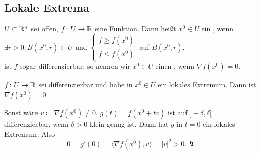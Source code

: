 \subsection{Lokale Extrema}
\begin{definition}
	$ U\subset\mathbb{R}^n $ sei offen, $ f\colon U\rightarrow\mathbb{R} $ eine Funktion. Dann hei\ss t $ x^0\in U $ ein , wenn $ \exists r>0: B(x^0,r)\subset U $ und $ \begin{cases}
	f\geq f(x^0)\\f\leq f(x^0)
	\end{cases} $ auf $ B(x^0,r) $.\\
	ist $ f $ sogar differenzierbar, so nennen wir $ x^0\in U $ einen , wenn $ \nabla f(x^0)=0 $. 
\end{definition}
\begin{lemma}
	$ f\colon U\rightarrow\mathbb{R} $ sei differenzierbar und habe in $ x^0 \in U$ ein lokales Extremum. Dann ist $ \nabla f(x^0)=0 $. 
\end{lemma}
\begin{beweis}
	Sonst w\"are $ v\coloneqq\nabla f(x^0)\neq 0 $. $ g(t)=f(x^0+tv) $ ist auf $ ]-\delta,\delta[ $ differenzierbar, wenn $ \delta>0 $ klein genug ist. Dann hat $ g $ in $ t=0 $ ein lokales Extremum. Also \[ 0=g'(0)=\langle\nabla f(x^0),v\rangle=|v|^2>0.\lightning \]
\end{beweis}
